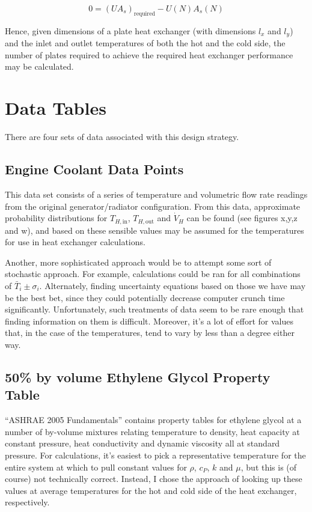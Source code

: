 \documentclass[12pt,letterpaper]{article}
\begin{document}
\begin{equation}
\label{eq:zeros}
0 = (UA_s)_{\textrm{required}} - U(N) A_s(N)
\end{equation}

Hence, given dimensions of a plate heat exchanger (with dimensions \(l_x\) and \(l_y\)) and the inlet and outlet temperatures of both the hot and the cold side, the number of plates required to achieve the required heat exchanger performance may be calculated.

\section{Data Tables}

There are four sets of data associated with this design strategy.

\subsection{Engine Coolant Data Points}

This data set consists of a series of temperature and volumetric flow rate readings from the original generator/radiator configuration. From this data, approximate probability distributions for \(T_{H, \textrm{in}}\), \(T_{H, \textrm{out}}\) and \(\dot{V}_H\) can be found (see figures x,y,z and w), and based on these sensible values may be assumed for the temperatures for use in heat exchanger calculations.

Another, more sophisticated approach would be to attempt some sort of stochastic approach. For example, calculations could be ran for all combinations of \(\bar{T}_i \pm \sigma_i\). Alternately, finding uncertainty equations based on those we have may be the best bet, since they could potentially decrease computer crunch time significantly. Unfortunately, such treatments of data seem to be rare enough that finding information on them is difficult. Moreover, it's a lot of effort for values that, in the case of the temperatures, tend to vary by less than a degree either way.

\subsection{50\% by volume Ethylene Glycol Property Table}

``ASHRAE 2005 Fundamentals'' contains property tables for ethylene glycol at a number of by-volume mixtures relating temperature to density, heat capacity at constant pressure, heat conductivity and dynamic viscosity all at standard pressure. For calculations, it's easiest to pick a representative temperature for the entire system at which to pull constant values for \(\rho\), \(c_P\), \(k\) and \(\mu\), but this is (of course) not technically correct. Instead, I chose the approach of looking up these values at average temperatures for the hot and cold side of the heat exchanger, respectively.
\end{document}
